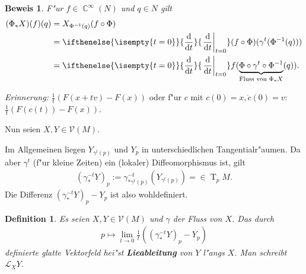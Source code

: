 \documentclass[paper=A4, twoside, chapterprefix=true, bibliography=totoc, headsepline]{scrbook}
\DeclareMathOperator{\C}{\mathbb{C}}
\DeclareMathOperator{\T}{T}         %
\newcommand{\dop}{\mathrm{d}}
\newcommand{\difffrac}[3][]{\ifthenelse{\isempty{#1}}{\frac{\dop #2}{\dop #3}}{\left. \frac{\dop #2}{\dop #3} \right|_{#1}}}
\theoremstyle{plain}
\newtheorem{Dfn}{Definition}[chapter]
\newtheorem{Bem}[Dfn]{Bemerkung}
\theoremstyle{nonumberplain}
\newtheorem{bew}{Beweis}
\theoremstyle{empty}
\theoremstyle{break}
\newcommand{\CmIndex}[2][]{\ifthenelse{\isempty{#1}}{\index{#2}}{\index{#1}}#2}
\newcommand{\CmMark}[2][]{\textbf{\CmIndex[#1]{#2}}}
\begin{document}
\begin{bew}
F"ur $f \in \C^{\infty}(N)$ und $q \in N$ gilt
\begin{align*}
	(\Phi_{\ast}X)(f)(q) & = X_{\Phi^{-1}(q)}(f \circ \Phi)\\
	& = \difffrac[t=0]{}{t} (f \circ \Phi)(\gamma^t(\Phi^{-1}(q)))\\
	& = \difffrac[t=0]{}{t}f(\underbrace{\Phi \circ \gamma^t \circ \Phi^{-1}}_{\text{Fluss von }\Phi_{*}X}(q)).
\end{align*}
\end{bew}

\emph{Erinnerung:} $\frac{1}t(F(x+tv)-F(x))$ oder f"ur $c$ mit $c(0) = x, \dot c(0) = v$: $\frac{1}t(F(c(t))-F(x))$.

Nun seien $X,Y \in \mathcal V(M)$.
\begin{center}\end{center}

Im Allgemeinen liegen $Y_{\gamma^t(p)}$ und $Y_p$ in unterschiedlichen Tangentialr"aumen.
Da aber $\gamma^t$ (f"ur kleine Zeiten) ein (lokaler) Diffeomorphismus ist, gilt
\begin{align*}
  (\gamma_{*}^{-t}Y)_p := \gamma_{*\gamma^t(p)}^{-t}(Y_{\gamma^t(p)}) = \in \T_pM.
\end{align*}
Die Differenz $(\gamma_{*}^{-t}Y)_p - Y_p$ ist also wohldefiniert. 

\begin{Dfn}
  Es seien $X,Y \in \mathcal V(M)$ und $\gamma$ der Fluss von $X$.
Das durch 
\begin{align*}
  p \mapsto \lim_{t\to 0}\frac{1}t\left(\left(\gamma_{*}^{-t}Y\right)_p-Y_p\right)
\end{align*}
definierte glatte Vektorfeld hei"st \CmMark{Lieableitung} von $Y$ l"angs $X$. Man schreibt $\mathcal L_XY$.
\end{Dfn}
\end{document}
